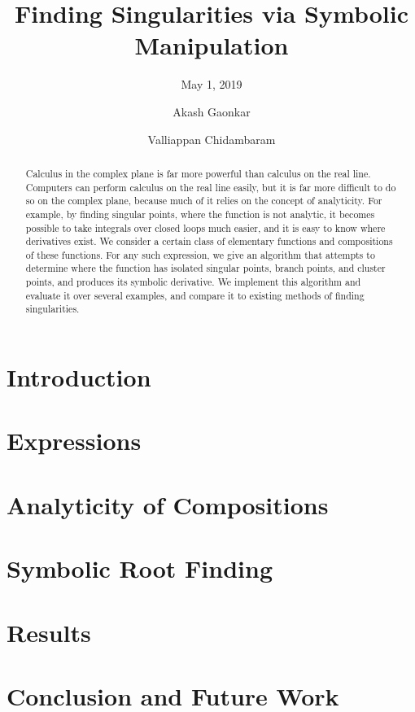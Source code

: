 \documentclass[sigplan]{acmart}
\title{Finding Singularities via Symbolic Manipulation}
\subtitle{May 1, 2019}
\author{Akash Gaonkar}
\affiliation{Undergraduate Student, \institution{University of Colorado at Boulder}}
\author{Valliappan Chidambaram}
\affiliation{Undergraduate Student, \institution{University of Colorado at Boulder}}
\theoremstyle{definition}
\begin{document}
  \begin{abstract}
		Calculus in the complex plane is far more powerful than calculus on the real line. Computers can perform calculus on the real line easily, but it is far more difficult to do so on the complex plane, because much of it relies on the concept of analyticity. For example, by finding singular points, where the function is not analytic, it becomes possible to take integrals over closed loops much easier, and it is easy to know where derivatives exist. We consider a certain class of elementary functions and compositions of these functions. For any such expression, we give an algorithm that attempts to determine where the function has isolated singular points, branch points, and cluster points, and produces its symbolic derivative. We implement this algorithm and evaluate it over several examples, and compare it to existing methods of finding singularities.
  \end{abstract}

  \maketitle

  \section{Introduction}
  \label{sec:introduction}
  

  \section{Expressions}
  \label{sec:expressions}
  

  \section{Analyticity of Compositions}
  \label{sec:analyticity}
  

  \section{Symbolic Root Finding}
  \label{sec:rootfinding}
  

  \section{Results}
  \label{sec:results}
  

  \section{Conclusion and Future Work}
  \label{sec:conclusion}
  

  \nocite{*}
  
  
\end{document}
